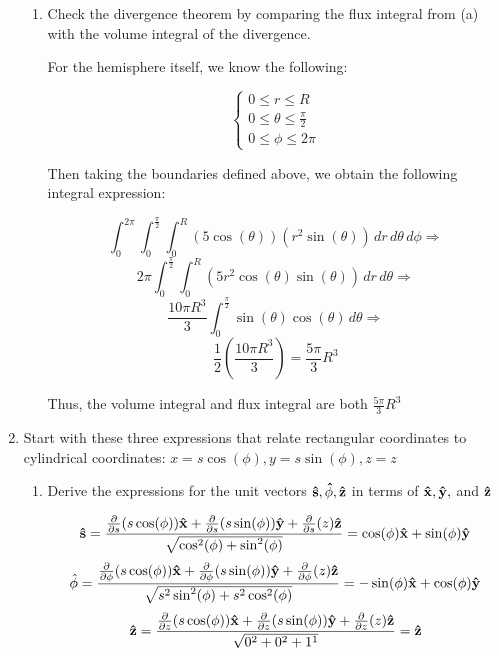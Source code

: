 \begin{enumerate}
\begin{enumerate}
      \item Check the divergence theorem by comparing the flux integral from (a) with the volume integral of the divergence.

        For the hemisphere itself, we know the following:

        $$\left\{\begin{array}{l} 0\leq r\leq R\\0\leq\theta\leq \frac{\pi}{2}\\0\leq\phi\leq 2\pi\end{array}$$

        Then taking the boundaries defined above, we obtain the following integral expression:

        $$\int_0^{2\pi}\int_0^{\frac{\pi}{2}}\int_0^R(5\cos(\theta))(r^2\sin(\theta))\,dr\,d\theta\,d\phi\Rightarrow $$
        $$2\pi\int_0^{\frac{\pi}{2}}\int_0^R(5r^2\cos(\theta)\sin(\theta))\,dr\,d\theta\Rightarrow$$
        $$\frac{10\pi R^3}{3}\int_0^{\frac{\pi}{2}}\sin(\theta)\cos(\theta)\,d\theta\Rightarrow$$
        $$\frac{1}{2}\left( \frac{10\pi R^3}{3} \right)=\boxed{\frac{5\pi}{3}R^3}$$

        Thus, the volume integral and flux integral are both $\frac{5\pi}{3}R^3$

    \end{enumerate}

  \item Start with these three expressions that relate rectangular coordinates to cylindrical coordinates: $x=s\cos(\phi), y=s\sin(\phi), z=z$

    \begin{enumerate}

      \item Derive the expressions for the unit vectors $\bold{\hat{s}},\bold{\hat{\phi}}, \bold{\hat{z}}$ in terms of $\bold{\hat{x}},\bold{\hat{y}},$ and $\bold{\hat{z}}$

        $$\bold{\hat{s}}=\frac{\frac{\partial}{\partial s}(s\cos(\phi))\bold{\hat{x}}+\frac{\partial}{\partial s}(s\sin(\phi))\bold{\hat{y}}+\frac{\partial}{\partial s}(z)\bold{\hat{z}}}{\sqrt{\cos^2(\phi)+\sin^2(\phi)}}=\cos(\phi)\bold{\hat{x}}+\sin(\phi)\bold{\hat{y}}$$
          $$\hat{\phi}=\frac{\frac{\partial}{\partial \phi}(s\cos(\phi))\bold{\hat{x}}+\frac{\partial}{\partial \phi}(s\sin(\phi))\bold{\hat{y}}+\frac{\partial}{\partial \phi}(z)\bold{\hat{z}}}{\sqrt{s^2\sin^2(\phi)+s^2\cos^2(\phi)}}=-\sin(\phi)\bold{\hat{x}}+\cos(\phi)\bold{\hat{y}}$$
          $$\bold{\hat{z}}=\frac{\frac{\partial}{\partial z}(s\cos(\phi))\bold{\hat{x}}+\frac{\partial}{\partial z}(s\sin(\phi))\bold{\hat{y}}+\frac{\partial}{\partial z}(z)\bold{\hat{z}}}{\sqrt{0^2+0^2+1^1}}=\bold{\hat{z}}$$


\end{enumerate}
\end{enumerate}
